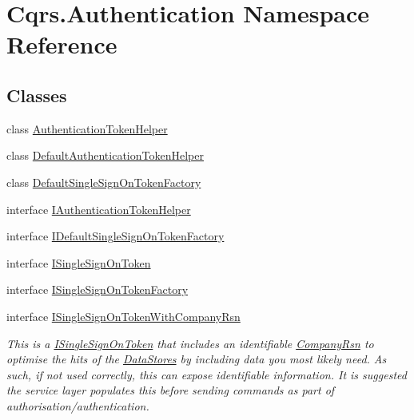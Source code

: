 \hypertarget{namespaceCqrs_1_1Authentication}{}\section{Cqrs.\+Authentication Namespace Reference}
\label{namespaceCqrs_1_1Authentication}
\subsection*{Classes}
\begin{DoxyCompactItemize}
\item 
class \hyperlink{classCqrs_1_1Authentication_1_1AuthenticationTokenHelper}{Authentication\+Token\+Helper}
\item 
class \hyperlink{classCqrs_1_1Authentication_1_1DefaultAuthenticationTokenHelper}{Default\+Authentication\+Token\+Helper}
\item 
class \hyperlink{classCqrs_1_1Authentication_1_1DefaultSingleSignOnTokenFactory}{Default\+Single\+Sign\+On\+Token\+Factory}
\item 
interface \hyperlink{interfaceCqrs_1_1Authentication_1_1IAuthenticationTokenHelper}{I\+Authentication\+Token\+Helper}
\item 
interface \hyperlink{interfaceCqrs_1_1Authentication_1_1IDefaultSingleSignOnTokenFactory}{I\+Default\+Single\+Sign\+On\+Token\+Factory}
\item 
interface \hyperlink{interfaceCqrs_1_1Authentication_1_1ISingleSignOnToken}{I\+Single\+Sign\+On\+Token}
\item 
interface \hyperlink{interfaceCqrs_1_1Authentication_1_1ISingleSignOnTokenFactory}{I\+Single\+Sign\+On\+Token\+Factory}
\item 
interface \hyperlink{interfaceCqrs_1_1Authentication_1_1ISingleSignOnTokenWithCompanyRsn}{I\+Single\+Sign\+On\+Token\+With\+Company\+Rsn}
\begin{DoxyCompactList}\small\item\em This is a \hyperlink{interfaceCqrs_1_1Authentication_1_1ISingleSignOnToken}{I\+Single\+Sign\+On\+Token} that includes an identifiable \hyperlink{interfaceCqrs_1_1Authentication_1_1ISingleSignOnTokenWithCompanyRsn_a26ffa6ca2e583f0ecc440b68fe3edd52_a26ffa6ca2e583f0ecc440b68fe3edd52}{Company\+Rsn} to optimise the hits of the \hyperlink{}{Data\+Stores} by including data you most likely need. As such, if not used correctly, this can expose identifiable information. It is suggested the service layer populates this before sending commands as part of authorisation/authentication. \end{DoxyCompactList}\item 

\end{DoxyCompactItemize}
